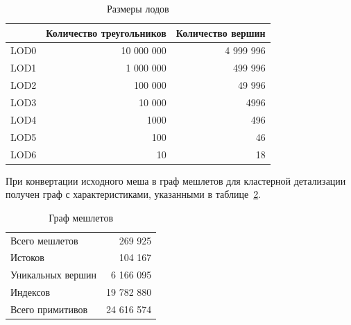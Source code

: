 \begin{table}[h]
    \centering

    \begin{tabular}{lrr}
        \hline \hline
        & Количество треугольников
        & Количество вершин \\ \hline
        LOD0 & 10 000 000 & 4 999 996 \\
        LOD1 &  1 000 000 &   499 996 \\
        LOD2 &    100 000 &    49 996 \\
        LOD3 &     10 000 &      4996 \\
        LOD4 &       1000 &       496 \\
        LOD5 &        100 &        46 \\
        LOD6 &         10 &        18 \\
        \hline \hline
    \end{tabular}

    \caption{Размеры лодов}
    \label{tab:lod-sizes}
\end{table}

При конвертации исходного меша в граф мешлетов для кластерной детализации получен граф с характеристиками, указанными в таблице~\ref{tab:graph-sizes}.

\begin{table}[h]
    \centering

    \begin{tabular}{lr}
        \hline \hline
        Всего мешлетов    &    269 925 \\
        Истоков           &    104 167 \\
        Уникальных вершин &  6 166 095 \\
        Индексов          & 19 782 880 \\
        Всего примитивов  & 24 616 574 \\
        \hline \hline
    \end{tabular}

    \caption{Граф мешлетов}
    \label{tab:graph-sizes}
\end{table}


